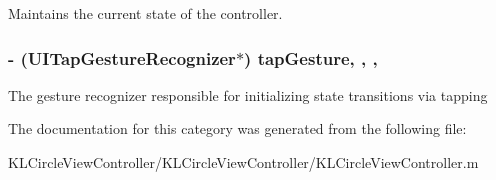 Maintains the current state of the controller. \hypertarget{category_k_l_circle_view_controller_07_08_ac6ddac5b62d3eebd9e2a220ae5f9d42b}{
\subsubsection[{tap\-Gesture}]{\setlength{\rightskip}{0pt plus 5cm}-\/ (U\-I\-Tap\-Gesture\-Recognizer$\ast$) tap\-Gesture\hspace{0.3cm}{\ttfamily [read]}, {\ttfamily [write]}, {\ttfamily [nonatomic]}, {\ttfamily [strong]}}}\label{category_k_l_circle_view_controller_07_08_ac6ddac5b62d3eebd9e2a220ae5f9d42b}
The gesture recognizer responsible for initializing state transitions via tapping 

The documentation for this category was generated from the following file\-:\begin{DoxyCompactItemize}
\item 
K\-L\-Circle\-View\-Controller/\-K\-L\-Circle\-View\-Controller/K\-L\-Circle\-View\-Controller.\-m\end{DoxyCompactItemize}

